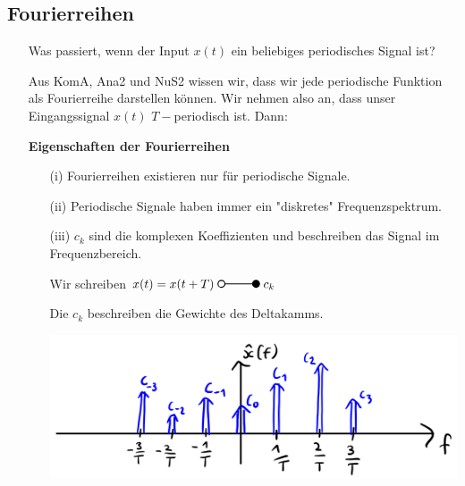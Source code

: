\documentclass[11pt]{article}
\newcommand{\transform}[2]{%
    \begin{tikzpicture}
        \draw[thick] (0,0) circle (0.1);
        \draw[thick] (0.1,0) -- (#2,0) node[midway, above] {#1};
        \filldraw[thick] (#2,0) circle (0.1);
    \end{tikzpicture}%
}
\begin{document}
{\pagebreak

\subsection*{Fourierreihen}
\vspace*{-0.5cm}
\begin{itemize}[leftmargin=0pt]
    \item[] Was passiert, wenn der Input $x(t)$ ein beliebiges periodisches Signal ist?
    \item[] Aus KomA, Ana2 und NuS2 wissen wir, dass wir jede periodische Funktion als Fourierreihe darstellen können. Wir nehmen also an, dass unser Eingangssignal $x(t)$ $T-$periodisch ist. Dann:
    \item[] %
    \item[] \textbf{Eigenschaften der Fourierreihen}\begin{itemize}
        \item[(i)] Fourierreihen existieren nur für periodische Signale.
        \item[(ii)] Periodische Signale haben immer ein "diskretes" Frequenzspektrum.
        \item[(iii)] $c_k$ sind die komplexen Koeffizienten und beschreiben das Signal im Frequenzbereich.
        \item[] Wir schreiben $x(t) = x(t+T) \; \transform{}{1} \; c_k$
        \item[] Die $c_k$ beschreiben die Gewichte des Deltakamms.
        \item[] \begin{center}
            \includegraphics[width=0.55\linewidth]{docimgs/delta_gewichtet.jpg}

\end{center}
\end{itemize}
\end{itemize}}
\end{document}
